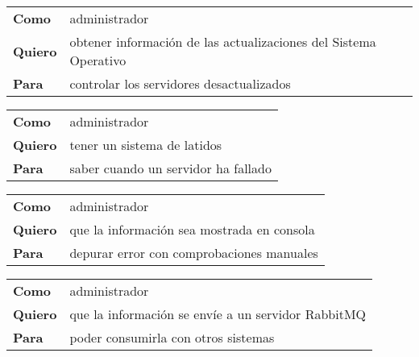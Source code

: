         \begin{tabular}{ll}
            \textbf{Como}   & administrador                                                         \\
            
            \textbf{Quiero} & obtener información de las actualizaciones del Sistema Operativo      \\
            
            \textbf{Para}   & controlar los servidores desactualizados                              \\
        \end{tabular}
        
        \begin{tabular}{ll}
            \textbf{Como}   & administrador                                                         \\
            
            \textbf{Quiero} & tener un sistema de latidos                                           \\
            
            \textbf{Para}   & saber cuando un servidor ha fallado                                   \\
        \end{tabular}
        
        \begin{tabular}{ll}
            \textbf{Como}   & administrador                                                         \\
            
            \textbf{Quiero} & que la información sea mostrada en consola                            \\
            
            \textbf{Para}   & depurar error con comprobaciones manuales                             \\
        \end{tabular}
        
        \begin{tabular}{ll}
            \textbf{Como}   & administrador                                                         \\
            
            \textbf{Quiero} & que la información se envíe a un servidor RabbitMQ                    \\
            
            \textbf{Para}   & poder consumirla con otros sistemas                                   \\
        \end{tabular}
        
